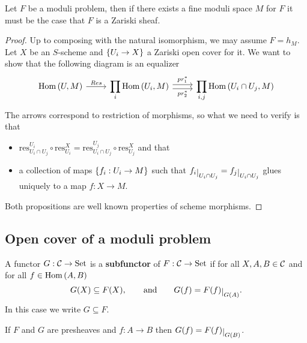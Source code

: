 \begin{proposition}\label{RepresentableModuliFunctorsAreZariskiSheaves}
Let $F$ be a moduli problem, then if there exists a fine moduli space $M$ for $F$ it must be the case that $F$ is a Zariski sheaf.
\end{proposition}
\begin{proof}
Up to composing with the natural isomorphism, we may assume $F=h_M$. 
Let $X$ be an $S$-scheme and $\left\{{U_i\to X}\right\}$ a Zariski open cover for it. 
We want to show that the following diagram is an equalizer
\[\begin{tikzcd}
	{\Hom(U,M)} & {\displaystyle \prod_i \Hom(U_i,M)} & {\displaystyle \prod_{i,j}\Hom(U_i\cap U_j,M)}
	\arrow["Res", from=1-1, to=1-2]
	\arrow["{pr_1^\ast}", shift left, from=1-2, to=1-3]
	\arrow["{pr_2^\ast}"', shift right, from=1-2, to=1-3]
\end{tikzcd}\]
The arrows correspond to restriction of morphisms, so what we need to verify is that
\begin{itemize}
\item $\mathrm{res}^{U_i}_{U_i\cap U_j}\circ \mathrm{res}^X_{U_i}=\mathrm{res}^{U_j}_{U_i\cap U_j}\circ \mathrm{res}^X_{U_j}$ and that
\item a collection of maps $\left\{{f_i:U_i\to M}\right\}$ such that $f_i\res{U_i\cap U_j}=f_j\res{U_i\cap U_j}$ glues uniquely to a map $f:X\to M$.
\end{itemize}
Both propositions are well known properties of scheme morphisms.
\end{proof}

\subsection{Open cover of a moduli problem}
\begin{definition}[Subfunctor]
A functor $G:\mathcal{C}\to \mathrm{Set}$ is a \textbf{subfunctor} of $F:\mathcal{C}\to \mathrm{Set}$ if for all $X,A,B\in \mathcal{C}$ and for all $f\in \mathrm{Hom}\,(A,B)$
\[G(X)\subseteq F(X),\qquad\text{and}\qquad G(f)=F(f)\res{G(A)}.\]
In this case we write $G\subseteq F$.
\end{definition}
\begin{remark}
If $F$ and $G$ are presheaves and $f:A\to B$ then $G(f)=F(f)\res{G(B)}$.
\end{remark}

